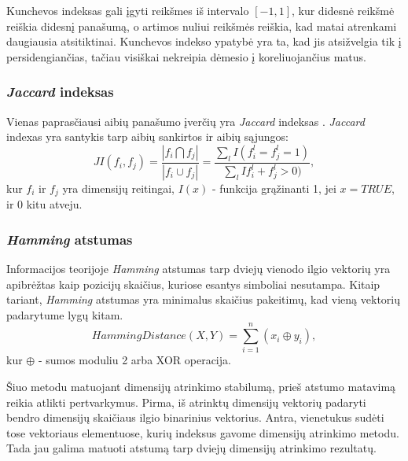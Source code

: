 Kunchevos indeksas gali įgyti reikšmes iš intervalo $[-1, 1]$, kur didesnė reikšmė reiškia didesnį panašumą, o artimos nuliui reikšmės reiškia, kad matai atrenkami daugiausia atsitiktinai. Kunchevos indekso ypatybė yra ta, kad jis atsižvelgia tik į persidengiančias, tačiau visiškai nekreipia dėmesio į koreliuojančius matus.

\subsubsection{\textit{Jaccard} indeksas}

Vienas paprasčiausi aibių panašumo įverčių yra \textit{Jaccard} indeksas \cite{jaccard1901etude}. \textit{Jaccard} indexas yra santykis tarp aibių sankirtos ir aibių sąjungos:
\begin{equation}
\label{jaccard_index}
 JI(f_i, f_j)=\frac{|f_i \bigcap f_j|}{|f_i \cup f_j|}=\frac{\sum_{l}I(f_i^l=f_j^l=1)}{\sum_{l}I{f_i^l+f_j^l > 0)}}, 
\end{equation}
kur $f_i$ ir $f_j$ yra dimensijų reitingai, $I(x)$ - funkcija grąžinanti 1, jei $x=TRUE$, ir 0 kitu atveju.

\subsubsection{\textit{Hamming} atstumas}

Informacijos teorijoje \textit{Hamming} atstumas \cite{hamming1950error} tarp dviejų vienodo ilgio vektorių yra apibrėžtas kaip pozicijų skaičius, kuriose esantys simboliai nesutampa. Kitaip tariant, \textit{Hamming} atstumas yra minimalus skaičius pakeitimų, kad vieną vektorių padarytume lygų kitam. 
\begin{equation}
\label{hamming_distance}
 Hamming Distance(X, Y)= \sum_{i=1}^{n} (x_i \oplus y_i),
\end{equation}
kur $\oplus$ - sumos moduliu 2 arba XOR operacija.

Šiuo metodu matuojant dimensijų atrinkimo stabilumą, prieš atstumo matavimą reikia atlikti pertvarkymus. Pirma, iš atrinktų dimensijų vektorių padaryti bendro dimensijų skaičiaus ilgio binarinius vektorius. Antra, vienetukus sudėti tose vektoriaus elementuose, kurių indeksus gavome dimensijų atrinkimo metodu. Tada jau galima matuoti atstumą tarp dviejų dimensijų atrinkimo rezultatų.
